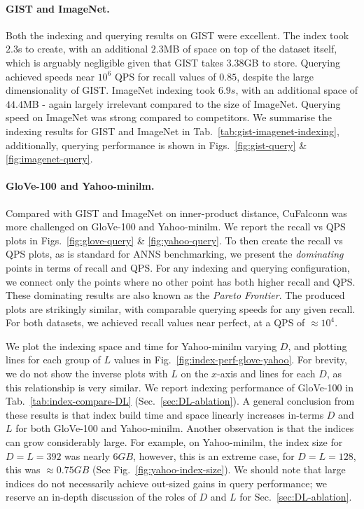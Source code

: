 \documentclass{article}
\newcommand{\cf}{CuFalconn\xspace}
\newcommand{\glv}{GloVe-100\xspace}
\newcommand{\ymlm}{Yahoo-minilm\xspace}
\begin{document}
\paragraph{GIST and ImageNet.} 

Both the indexing and querying results on GIST were excellent. The index took $2.3$s to create, with an additional $2.3$MB of space on top of the dataset itself, which is arguably negligible given that GIST takes $3.38$GB to store. Querying achieved speeds near $10^6$ QPS for recall values of $0.85$, despite the large dimensionality of GIST. ImageNet indexing took $6.9s$, with an additional space of $44.4$MB - again largely irrelevant compared to the size of ImageNet. Querying speed on ImageNet was strong compared to competitors. We summarise the indexing results for GIST and ImageNet in Tab.~\ref{tab:gist-imagenet-indexing}, additionally, querying performance is shown in Figs.~\ref{fig:gist-query} \& \ref{fig:imagenet-query}.

\paragraph{\glv and \ymlm.} 

Compared with GIST and ImageNet on inner-product distance, \cf was more challenged on \glv and \ymlm. We report the recall vs QPS plots in Figs.~\ref{fig:glove-query} \& \ref{fig:yahoo-query}. To then create the recall vs QPS plots, as is standard for ANNS benchmarking, we present the \emph{dominating} points in terms of recall and QPS. For any indexing and querying configuration, we connect only the points where no other point has both higher recall and QPS. These dominating results are also known as the \emph{Pareto Frontier}. The produced plots are strikingly similar, with comparable querying speeds for any given recall. For both datasets, we achieved recall values near perfect, at a QPS of $\approx 10^4$.

We plot the indexing space and time for \ymlm varying $D$, and plotting lines for each group of $L$ values in Fig.~\ref{fig:index-perf-glove-yahoo}. For brevity, we do not show the inverse plots with $L$ on the $x$-axis and lines for each $D$, as this relationship is very similar. We report indexing performance of \glv in Tab.~\ref{tab:index-compare-DL} (Sec.~\ref{sec:DL-ablation}). A general conclusion from these results is that index build time and space linearly increases in-terms $D$ and $L$ for both \glv and \ymlm. Another observation is that the indices can grow considerably large. For example, on \ymlm, the index size for $D=L=392$ was nearly $6GB$, however, this is an extreme case, for $D = L = 128$, this was $\approx 0.75GB$ (See Fig.~\ref{fig:yahoo-index-size}). We should note that large indices do not necessarily achieve out-sized gains in query performance; we reserve an in-depth discussion of the roles of $D$ and $L$ for Sec.~\ref{sec:DL-ablation}.
\end{document}
